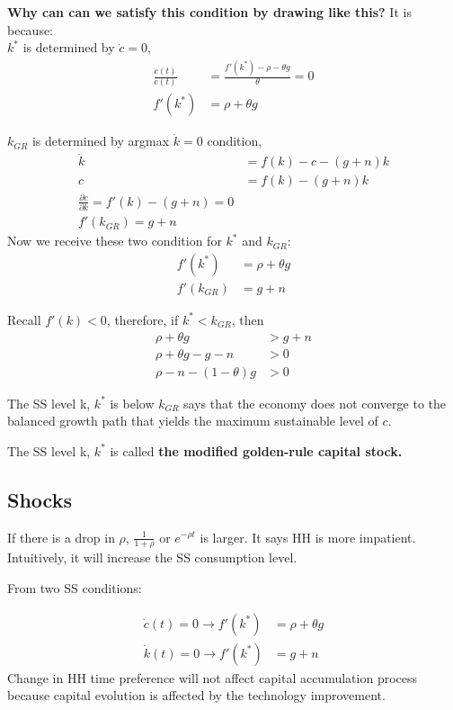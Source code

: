 \documentclass[12pt]{article}
\begin{document}
{\textbf {Why can can we satisfy this condition by drawing like this?}}
It is because:\\
$ k ^{*} $ is determined by $ \dot{c} = 0 $,
\begin{align*}
		\frac{\dot{c}(t)}{c(t)} &= \frac{f'(k ^{*}) - \rho - \theta g}{\theta} = 0\\
		f'(k ^{*})&= \rho + \theta g
\end{align*}

$ k_{GR} $ is determined by argmax $ \dot{k} = 0 $ condition,
\begin{align*}
\dot{k} &= f(k) - c - (g + n)k\\
c &= f(k) - (g + n)k\\
\frac{\partial c }{\partial k } = f'(k) - (g + n) = 0\\
f'(k_{GR}) = g + n
\end{align*}
Now we receive these two condition for $ k ^{*} $ and $ k_{GR} $:
\begin{align*}
f'(k ^{*}) &= \rho + \theta g\\
f'(k_{GR}) &= g + n
\end{align*}

Recall $ f'(k) < 0 $, therefore, if $ k ^{*} < k_{GR} $, then 
\begin{align*}
\rho + \theta g &> g + n\\
\rho + \theta g  - g - n &> 0\\
\rho - n - (1 - \theta)g &> 0
\end{align*}




The SS level k, $ k ^{*} $ is below $ k_{GR} $ says that the economy does not converge
to the balanced growth path that yields the maximum sustainable level of $ c $.

The SS level k, $ k ^{*} $ is called {\textbf {the modified golden-rule capital stock.}}




\subsection{Shocks}
If there is a drop in $ \rho $, $ \frac{1}{1 + \rho} $ or $ e^{ - \rho t} $ is larger.
It says HH is more impatient. Intuitively, it will increase the SS consumption level.

From two SS conditions:

\begin{align*}
\dot{c}(t) = 0 \rightarrow f'(k ^{*}) &= \rho + \theta g\\
\dot{k}(t) = 0 \rightarrow f'(k ^{*}) &= g + n
\end{align*}
Change in HH time preference will not affect capital accumulation process because
capital evolution is affected by the technology improvement. 
\end{document}
